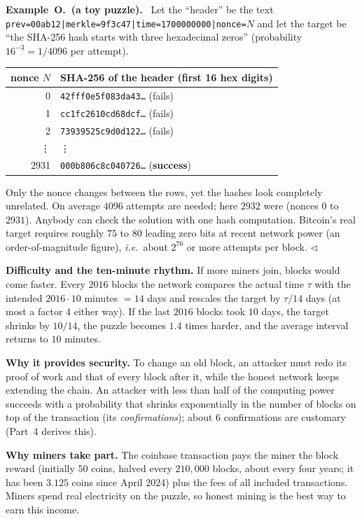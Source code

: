 \documentclass[11pt,a4paper]{article}
\newcounter{exn}[section]
\newcounter{oexn}
\renewcommand{\theoexn}{O.\arabic{oexn}}
\newenvironment{oexbox}[1][]{\par\medskip\refstepcounter{oexn}\noindent\textbf{Example~\theoexn\if\relax\detokenize{#1}\relax\else\ (#1)\fi.}\ \ignorespaces}{\hfill$\triangleleft$\par\medskip}
\theoremstyle{definition}
\theoremstyle{plain}
\theoremstyle{remark}
\newcommand{\ie}{\textit{i.e.}}
\begin{document}
\begin{oexbox}[a toy puzzle]
Let the ``header'' be the text \texttt{prev=00ab12\allowbreak|merkle=9f3c47\allowbreak|time=1700000000\allowbreak|nonce=}$N$ and let the target be ``the SHA-256 hash starts with three hexadecimal zeros'' (probability $16^{-3}=1/4096$ per attempt).
\begin{center}\footnotesize
\begin{tabular}{@{}rl@{}}
\toprule
nonce $N$ & SHA-256 of the header (first 16 hex digits) \\
\midrule
0 & \texttt{42fff0e5f083da43\ldots} (fails)\\
1 & \texttt{cc1fc2610cd68dcf\ldots} (fails)\\
2 & \texttt{73939525c9d0d122\ldots} (fails)\\
\vdots & \vdots\\
2931 & \texttt{000b806c8c040726\ldots} (\textbf{success})\\
\bottomrule
\end{tabular}
\end{center}
Only the nonce changes between the rows, yet the hashes look completely unrelated. On average $4096$ attempts are needed; here $2932$ were (nonces $0$ to $2931$). Anybody can check the solution with one hash computation. Bitcoin's real target requires roughly $75$ to $80$ leading zero bits at recent network power (an order-of-magnitude figure), \ie\ about $2^{76}$ or more attempts per block.
\end{oexbox}

\textbf{Difficulty and the ten-minute rhythm.} If more miners join, blocks would come faster. Every $2016$ blocks the network compares the actual time $\tau$ with the intended $2016\cdot10$ minutes $=14$ days and rescales the target by $\tau/14$ days (at most a factor $4$ either way). If the last $2016$ blocks took $10$ days, the target shrinks by $10/14$, the puzzle becomes $1.4$ times harder, and the average interval returns to $10$ minutes.

\textbf{Why it provides security.} To change an old block, an attacker must redo its proof of work and that of every block after it, while the honest network keeps extending the chain. An attacker with less than half of the computing power succeeds with a probability that shrinks exponentially in the number of blocks on top of the transaction (its \emph{confirmations}); about $6$ confirmations are customary (Part~4 derives this).

\textbf{Why miners take part.} The coinbase transaction pays the miner the block reward (initially $50$ coins, halved every $210{,}000$ blocks, about every four years; it has been $3.125$ coins since April 2024) plus the fees of all included transactions. Miners spend real electricity on the puzzle, so honest mining is the best way to earn this income.
\end{document}
